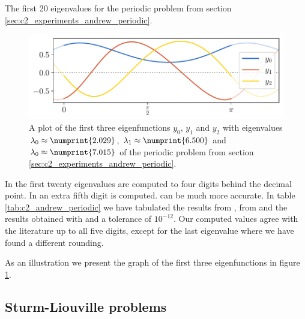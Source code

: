\begin{table}
    \begin{center}
        
    \end{center}
    \caption{The first 20 eigenvalues for the periodic problem from section \ref{sec:c2_experiments_andrew_periodic}.}\label{tab:c2_andrew_periodic}
\end{table}

\begin{figure}
    \begin{center}
        \includegraphics[width=1\textwidth]{img/chapter2/matslise_periodic_eigenfunctions.pdf}
    \end{center}
    \caption{A plot of the first three eigenfunctions $y_0$, $y_1$ and $y_2$ with eigenvalues $\lambda_0\approx\numprint{2.029}$, $\lambda_1\approx\numprint{6.500}$ and $\lambda_0\approx\numprint{7.015}$ of  the periodic problem from section \ref{sec:c2_experiments_andrew_periodic}.}\label{fig:c2_periodic_eigenfunctions}
\end{figure}

In \cite{andrew_correction_1989} the first twenty eigenvalues are computed to four digits behind the decimal point. In \cite{vandenberghe_modified_1995} an extra fifth digit is computed.  can be much more accurate. In table \ref{tab:c2_andrew_periodic} we have tabulated the results from \cite{andrew_correction_1989}, from \cite{vandenberghe_modified_1995} and the results obtained with \pyslise{} and a tolerance of $10^{-12}$. Our computed values agree with the literature up to all five digits, except for the last eigenvalue where we have found a different rounding.

As an illustration we present the graph of the first three eigenfunctions in figure \ref{fig:c2_periodic_eigenfunctions}.


\subsection{Sturm-Liouville problems}\label{sec:c2_experiment_sturm_liouville}

